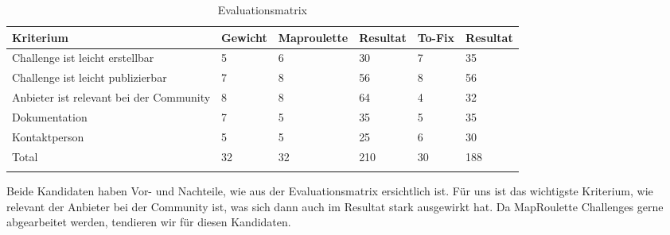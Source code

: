 \begin{table}
    \begin{tabular}{|p{5cm}|p{1.5cm}|p{2cm}|p{1.5cm}|p{1.5cm}|p{1.5cm}|}
    \hline    
    \rowcolor{lightblue}
    Kriterium & Gewicht & Maproulette & Resultat &To-Fix & Resultat\\ \hline
	Challenge ist leicht erstellbar & 5 & 6 & 30 & 7 & 35 \\ \hline
	Challenge ist leicht publizierbar & 7 & 8 & 56 & 8 & 56 \\ \hline
	Anbieter ist relevant bei der Community & 8 & 8 & 64 & 4 & 32 \\ \hline
	Dokumentation & 7 & 5 & 35 & 5 & 35 \\ \hline
	Kontaktperson & 5 & 5 & 25 & 6 & 30 \\ \hline
	\rowcolor{lightblue} Total & 32 & 32 & 210 & 30 & 188 \\ \hline
    \caption[Evaluationsmatrix]{Evaluationsmatrix}
    \end{tabular}
\end{table}

Beide Kandidaten haben Vor- und Nachteile, wie aus der Evaluationsmatrix ersichtlich ist. Für uns ist das wichtigste Kriterium, wie relevant der Anbieter bei der Community ist, was sich dann auch im Resultat stark ausgewirkt hat. Da MapRoulette Challenges gerne abgearbeitet werden, tendieren wir für diesen Kandidaten.  
